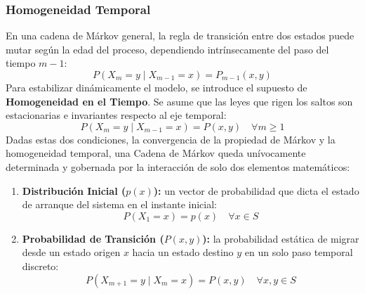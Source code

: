\subsubsection{Homogeneidad Temporal}
\noindent
En una cadena de Márkov general, la regla de transición entre dos estados puede mutar según la edad del proceso, dependiendo intrínsecamente del paso del tiempo $m-1$:
\begin{equation*}
    P(X_m = y \mid X_{m-1} = x) = P_{m-1}(x, y)
\end{equation*}
Para estabilizar dinámicamente el modelo, se introduce el supuesto de \textbf{Homogeneidad en el Tiempo}. Se asume que las leyes que rigen los saltos son estacionarias e invariantes respecto al eje temporal:
\begin{equation*}
    P(X_m = y \mid X_{m-1} = x) = P(x, y) \quad \forall m \geq 1
\end{equation*}
Dadas estas dos condiciones, la convergencia de la propiedad de Márkov y la homogeneidad temporal, una Cadena de Márkov queda unívocamente determinada y gobernada por la interacción de solo dos elementos matemáticos:
\begin{enumerate}
    \item \textbf{Distribución Inicial ($p(x)$):} un vector de probabilidad que dicta el estado de arranque del sistema en el instante inicial:
    \begin{equation*}
        P(X_1 = x) = p(x) \quad \forall x \in S
    \end{equation*}
    \item \textbf{Probabilidad de Transición ($P(x,y)$):} la probabilidad estática de migrar desde un estado origen $x$ hacia un estado destino $y$ en un solo paso temporal discreto:
    \begin{equation*}
        P(X_{m+1} = y \mid X_m = x) = P(x, y) \quad \forall x,y \in S
    \end{equation*}
\end{enumerate}

